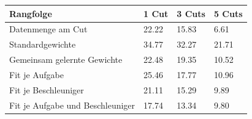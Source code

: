 \begin{tabular}{@{}llll@{}}
\toprule
Rangfolge & 1 Cut & 3 Cuts & 5 Cuts \\
\midrule
Datenmenge am Cut & 22.22 & 15.83 & 6.61 \\
Standardgewichte & 34.77 & 32.27 & 21.71 \\
Gemeinsam gelernte Gewichte & 22.48 & 19.35 & 10.52 \\
Fit je Aufgabe & 25.46 & 17.77 & 10.96 \\
Fit je Beschleuniger & 21.11 & 15.29 & 9.89 \\
Fit je Aufgabe und Beschleuniger & 17.74 & 13.34 & 9.80 \\
\bottomrule
\end{tabular}
